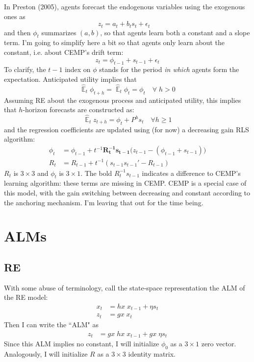 \documentclass[11pt]{article}
\renewcommand{\[}{\begin{equation}}
\renewcommand{\]}{\end{equation}}
\DeclareMathOperator{\E}{\mathbb{E}}
\begin{document}
In Preston (2005), agents forecast the endogenous variables using the exogenous ones as
\begin{equation}
z_t = a_t + b_t s_t + \epsilon_t \quad  \tag{Preston, p. 101}
\end{equation}
and then $\phi_t$ summarizes $(a,b)$, so that agents learn both a constant and a slope term. I'm going to simplify here a bit so that agents only learn about the constant, i.e. about CEMP's drift term:
\begin{equation}
z_t = \phi_{t-1} + s_{t-1} + \epsilon_t \label{PLM}  
\end{equation}
To clarify, the $t-1$ index on $\phi$ stands for the period \emph{in which} agents form the expectation. Anticipated utility implies that
\begin{equation}
\hat{\E}_t{\phi_{t+h}} = \hat{\E}_t{\phi_{t}} = \phi_t \quad \forall \; h>0 
\end{equation}
Assuming RE about the exogenous process and anticipated utility, this implies that $h$-horizon forecasts are constructed as:
\begin{equation}
\hat{\E}_t z_{t+h} = \phi_{t} + P^{h}s_t  \quad \forall h\geq 1 \label{PLM_fcst}
\end{equation}
and the regression coefficients are updated using (for now) a decreasing gain RLS algorithm:
\begin{align}
\phi_t  & = \phi_{t-1} + t^{-1} \mathbf{R_t^{-1}s_{t-1}}\big(z_{t-1} - (\phi_{t-1}+ s_{t-1})\big) \\
R_t &= R_{t-1} +  t^{-1} ( s_{t-1}s_{t-1}' - R_{t-1} )
\end{align}
$R_t$ is $3\times 3$ and $\phi_t$ is $3 \times 1$. The bold $R_t^{-1}s_{t-1}$ indicates a difference to CEMP's learning algorithm: these terms are missing in CEMP. CEMP is a special case of this model, with the gain switching between decreasing and constant according to the anchoring mechanism. I'm leaving that out for the time being. 

\section{ALMs}
\subsection{RE}
With some abuse of terminology, call the state-space representation the ALM of the RE model:
\begin{align}
x_{t} & = hx \; x_{t-1} + \eta s_t \label{state_eq}\\
z_t & = gx \; x_t \label{obs_eq}
\end{align}
Then I can write the ``ALM" as
\begin{align}
z_t & = gx \; hx \; x_{t-1} + gx \; \eta s_t  \label{ALM_RE}
\end{align}
Since this ALM implies no constant, I will initialize $\phi_0$ as a $3\times1$ zero vector. Analogously, I will initialize $R$ as a $3\times3$ identity matrix. 
\end{document}
